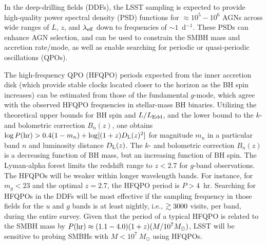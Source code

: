 In the deep-drilling fields (DDFs), the LSST sampling is expected to provide
high-quality power spectral density (PSD) functions for $\approx10^{5} - 10^{6}$
AGNs across wide ranges of $L$, $z$, and $\lambda_{\rm eff}$ down to frequencies of
$\sim1$~d$^{-1}$. These PSDs can enhance AGN selection, and can be used to
constrain the SMBH mass and accretion rate/mode, as well as enable searching for
periodic or quasi-periodic oscillations (QPOs).

%
%


The high-frequency QPO (HFQPO) periods expected from the inner accretion disk
(which provide stable clocks located closer to the horizon as the BH spin increases)
can be estimated from those of the fundamental $g$-mode, which agree with
the observed HFQPO frequencies in stellar-mass BH binaries. Utilizing the
theoretical upper bounds for BH spin and $L/L_{\rm Edd}$, and the lower
bound to the $k$- and bolometric correction $B_n(z)$, one obtains
$\log P({\rm hr}) > 0.4(1-m_n) + \log[(1+z)D_{\rm L}(z)^2]$ for magnitude
$m_n$ in a particular band $n$ and luminosity distance $D_{\rm L}(z)$.
The $k$- and bolometric correction $B_n(z)$ is a decreasing function of BH mass,
but an increasing function of BH spin. The Lyman-alpha forest limits the redshift
range to $z < 2.7$ for $g$-band observations. The HFQPOs will be weaker within longer
wavelength bands.
For instance, for $m_g  <  23$ and the optimal $z =  2.7$, the HFQPO period is $P > 4$~hr.
%
Searching for HFQPOs in the DDFs will be most effective if the sampling frequency
in those fields for the $u$ and $g$ bands is at least nightly, i.e., $\gtrsim3000$
visits, per band, during the entire survey. Given that the period of a typical HFQPO is
related to the SMBH mass by $P({\rm hr}) \approx (1.1-4.0)(1+z)(M/10^{7}M_{\odot})$,
LSST will be sensitive to probing SMBHs with $M < 10^{7}~M_{\odot}$ using HFQPOs.

